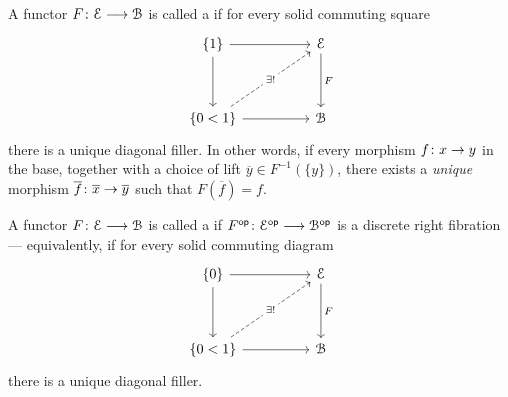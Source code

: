 \documentclass{amsbook}
\begin{document}
\begin{definition}
    A functor $F \colon \mathcal E \longrightarrow \mathcal B$ is called a  if for every solid commuting square
    \begin{equation}
        \begin{tikzcd}[ampersand replacement=\&]
            {\{1\}} \&\& \cE \\
            \\
            {\{0<1\}} \&\& \cB
            \arrow[from=1-1, to=1-3]
            \arrow[from=1-1, to=3-1]
            \arrow["F", from=1-3, to=3-3]
            \arrow["{\exists!}"{description}, dashed, from=3-1, to=1-3]
            \arrow[from=3-1, to=3-3]
        \end{tikzcd}
    \end{equation} 
    there is a unique diagonal filler. In other words, if every morphism $f \colon x \rightarrow y$ in the base, together with a choice of lift $\overline{y} \in F^{-1}(\{y\})$, there exists a \emph{unique} morphism $\overline{f}\colon \overline{x} \rightarrow \overline{y}$ such that $F(\overline{f}) = f$.
    
    \medskip

    \nid A functor $F\colon \mathcal E \longrightarrow \mathcal B$ is called a  if $F^{\mathsf{op}} \colon \mathcal E^{\mathsf{op}} \longrightarrow \mathcal B^{\mathsf{op}}$ is a discrete right fibration — equivalently, if for every solid commuting diagram 
    \begin{equation}
        \begin{tikzcd}[ampersand replacement=\&]
            {\{0\}} \&\& \cE \\
            \\
            {\{0<1\}} \&\& \cB
            \arrow[from=1-1, to=1-3]
            \arrow[from=1-1, to=3-1]
            \arrow["F", from=1-3, to=3-3]
            \arrow["{\exists!}"{description}, dashed, from=3-1, to=1-3]
            \arrow[from=3-1, to=3-3]
        \end{tikzcd}
    \end{equation}
    there is a unique diagonal filler.
\end{definition}
\end{document}
